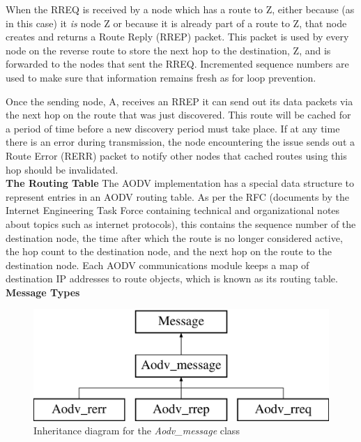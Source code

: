 When the RREQ is received by a node which has a route to Z, either because (as in this case) it \textit{is} node Z or because it is already part of a route to Z, that node creates and returns a Route Reply (RREP) packet. This packet is used by every node on the reverse route to store the next hop to the destination, Z, and is forwarded to the nodes that sent the RREQ. Incremented sequence numbers are used to make sure that information remains fresh as for loop prevention. 

Once the sending node, A, receives an RREP it can send out its data packets via the next hop on the route that was just discovered. This route will be cached for a period of time before a new discovery period must take place. If at any time there is an error during transmission, the node encountering the issue sends out a Route Error (RERR) packet to notify other nodes that cached routes using this hop should be invalidated.\\

\noindent\textbf{The Routing Table}
The AODV implementation has a special data structure to represent entries in an AODV routing table. As per the RFC (documents by the Internet Engineering Task Force containing technical and organizational notes about topics such as internet protocols), this contains the sequence number of the destination node, the time after which the route is no longer considered active, the hop count to the destination node, and the next hop on the route to the destination node. Each AODV communications module keeps a map of destination IP addresses to route objects, which is known as its routing table.\\

\noindent\textbf{Message Types}
\begin{figure}[H]
\centering	
\includegraphics[scale=0.6]{../documentation/latex/class_aodv__message}	
\caption{Inheritance diagram for the \textit{Aodv\_message} class}
\label{aodvmess}
\end{figure}

